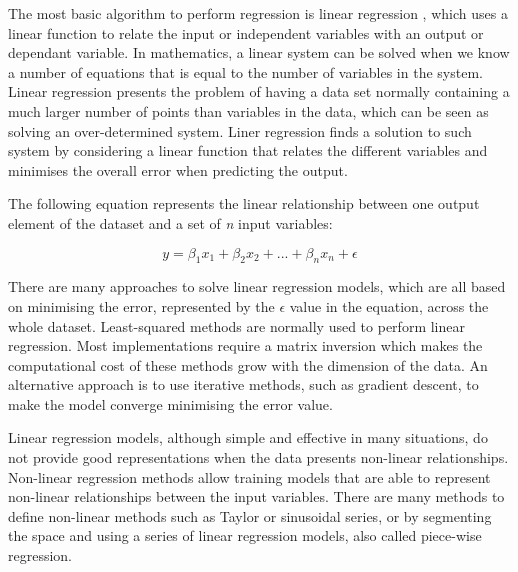 \medskip

The most basic algorithm to perform regression is linear regression \citep{neter1989applied}, which uses a linear function to relate the input or independent variables with an output or dependant variable. In mathematics, a linear system can be solved when we know a number of equations that is equal to the number of variables in the system. Linear regression presents the problem of having a data set normally containing a much larger number of points than variables in the data, which can be seen as solving an over-determined system. Liner regression finds a solution to such system by considering a linear function that relates the different variables and minimises the overall error when predicting the output.

\medskip

The following equation represents the linear relationship between one output element of the dataset and a set of \textit{n} input variables:

\[ y = \beta_1 x_{1} + \beta_2 x_{2} + ... + \beta_n x_{n} + \epsilon \]

There are many approaches to solve linear regression models, which are all based on minimising the error, represented by the $\epsilon$ value in the equation, across the whole dataset.  Least-squared methods are normally used to perform linear regression. Most implementations require a matrix inversion which makes the computational cost of these methods grow with the dimension of the data. An alternative approach is to use iterative methods, such as gradient descent, to make the model converge minimising the error value. 

\medskip

Linear regression models, although simple and effective in many situations, do not provide good representations when the data presents non-linear relationships. Non-linear regression methods allow training models that are able to represent non-linear relationships between the input variables. There are many methods to define non-linear methods such as Taylor or sinusoidal series, or by segmenting the space and using a series of linear regression models, also called piece-wise regression.

\medskip

